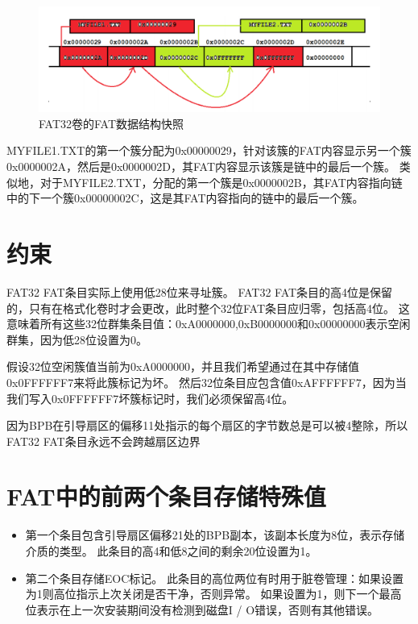 \begin{figure}[h]
	\centering
	\includegraphics[scale=0.5]{figures/1.png}
	\caption{FAT32卷的FAT数据结构快照}
	\label{fig:2}
\end{figure}

\par
MYFILE1.TXT的第一个簇分配为0x00000029，针对该簇的FAT内容显示另一个簇0x0000002A，然后是0x0000002D，其FAT内容显示该簇是链中的最后一个簇。 类似地，对于MYFILE2.TXT，分配的第一个簇是0x0000002B，其FAT内容指向链中的下一个簇0x00000002C，这是其FAT内容指向的链中的最后一个簇。

\section{约束}
FAT32 FAT条目实际上使用低28位来寻址簇。 FAT32 FAT条目的高4位是保留的，只有在格式化卷时才会更改，此时整个32位FAT条目应归零，包括高4位。 这意味着所有这些32位群集条目值：0xA0000000,0xB0000000和0x00000000表示空闲群集，因为低28位设置为0。
\par
假设32位空闲簇值当前为0xA0000000，并且我们希望通过在其中存储值0x0FFFFFF7来将此簇标记为坏。 然后32位条目应包含值0xAFFFFFF7，因为当我们写入0x0FFFFFF7坏簇标记时，我们必须保留高4位。
\par
因为BPB在引导扇区的偏移11处指示的每个扇区的字节数总是可以被4整除，所以FAT32 FAT条目永远不会跨越扇区边界

\section{FAT中的前两个条目存储特殊值}
\begin{itemize}
	\item 第一个条目包含引导扇区偏移21处的BPB副本，该副本长度为8位，表示存储介质的类型。 此条目的高4和低8之间的剩余20位设置为1。
	\item 第二个条目存储EOC标记。 此条目的高位两位有时用于脏卷管理：如果设置为1则高位指示上次关闭是否干净，否则异常。 如果设置为1，则下一个最高位表示在上一次安装期间没有检测到磁盘I / O错误，否则有其他错误。
\end{itemize}

